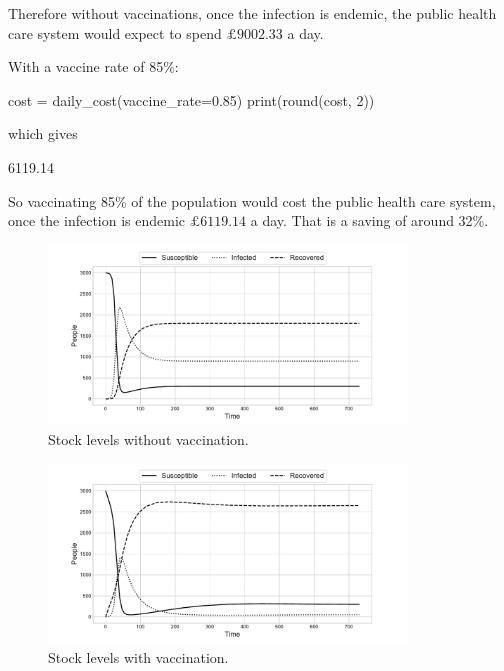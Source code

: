 Therefore without vaccinations, once the infection is endemic, the public health
care system would expect to spend $\pounds 9002.33$ a day.

With a vaccine rate of 85\%:

\begin{pyin}
cost = daily_cost(vaccine_rate=0.85)
print(round(cost, 2))
\end{pyin}

which gives

\begin{pyout}
6119.14
\end{pyout}

So vaccinating 85\% of the population would cost the public health care system,
once the infection is endemic $\pounds 6119.14$ a day. That is a saving of
around 32\%.

\begin{figure}
\begin{center}
\includegraphics[width=0.85\textwidth]{./assets/sd_vaccine_plots/plot_no_vaccine.pdf}
\end{center}
\caption{Stock levels without vaccination.}
\label{fig:plot_no_vaccine}
\end{figure}

\begin{figure}
\begin{center}
\includegraphics[width=0.85\textwidth]{./assets/sd_vaccine_plots/plot_with_vaccine.pdf}
\end{center}
\caption{Stock levels with vaccination.}
\label{fig:plot_with_vaccine}
\end{figure}


